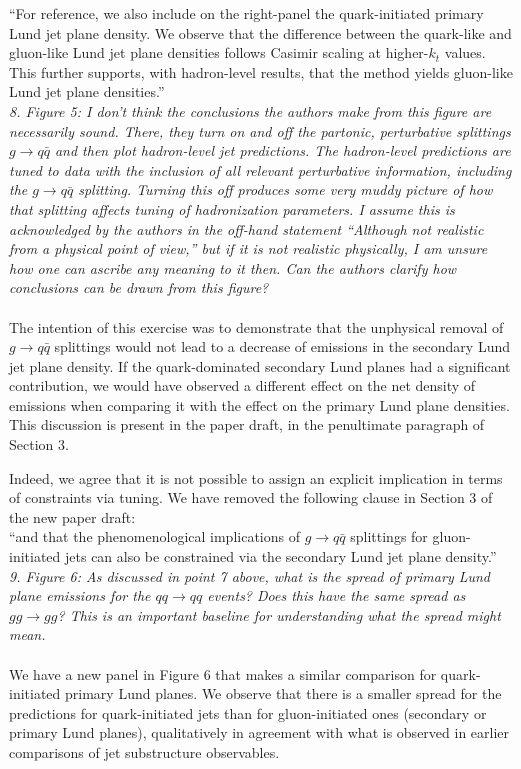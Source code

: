 \documentclass[a4paper,11pt]{article}
\begin{document}
``For reference, we also include on the right-panel the quark-initiated primary Lund jet plane density. We observe that the difference between the quark-like and gluon-like Lund jet plane densities follows Casimir scaling at higher-$k_t$ values. This further supports, with hadron-level results, that the method yields gluon-like Lund jet plane densities.''
\\

\noindent\textit{8. Figure 5: I don’t think the conclusions the authors make from this figure are necessarily sound. There, they turn on and off the partonic, perturbative splittings $g\to q\bar q$ and then plot hadron-level jet predictions. The hadron-level predictions are tuned to data with the inclusion of all relevant perturbative information, including the $g\to q\bar q$ splitting. Turning this off produces some very muddy picture of how that splitting affects tuning of hadronization parameters. I assume this is acknowledged by the authors in the off-hand statement “Although not realistic from a physical point of view,” but if it is not realistic physically, I am unsure how one can ascribe any meaning to it then. Can the authors clarify how conclusions can be drawn from this figure?}
\\
\\
The intention of this exercise was to demonstrate that the unphysical removal of  $g\to q\bar{q}$ splittings would not lead to a decrease of emissions in the secondary Lund jet plane density. If the quark-dominated secondary Lund planes had a significant contribution, we would have observed a different effect on the net density of emissions when comparing it with the effect on the primary Lund plane densities. This discussion is present in the paper draft, in the penultimate paragraph of Section 3.

Indeed, we agree that it is not possible to assign an explicit implication in terms of constraints via tuning. We have removed the following clause in Section 3 of the new paper draft:
\\

``and that the phenomenological implications of $g\to q\bar{q}$ splittings for gluon-initiated jets can also be constrained via the secondary Lund jet plane density.”
\\

\noindent\textit{9. Figure 6: As discussed in point 7 above, what is the spread of primary Lund plane emissions for the $qq\to qq$ events? Does this have the same spread as $gg\to gg$? This is an important baseline for understanding what the spread might mean.
}
\\
\\
We have a new panel in Figure 6 that makes a similar comparison for quark-initiated primary Lund planes. We observe that there is a smaller spread for the predictions for quark-initiated jets than for gluon-initiated ones (secondary or primary Lund planes), qualitatively in agreement with what is observed in earlier comparisons of jet substructure observables.
\end{document}
